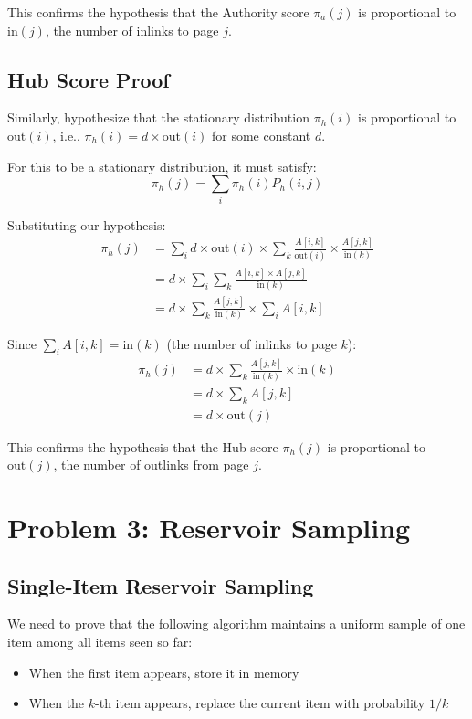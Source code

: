 \documentclass{article}
\begin{document}
This confirms the hypothesis that the Authority score $\pi_a(j)$ is proportional to $\text{in}(j)$, the number of inlinks to page $j$.

\subsection{Hub Score Proof}

Similarly, hypothesize that the stationary distribution $\pi_h(i)$ is proportional to $\text{out}(i)$, i.e., $\pi_h(i) = d \times \text{out}(i)$ for some constant $d$.

For this to be a stationary distribution, it must satisfy:
\begin{equation}
    \pi_h(j) = \sum_i \pi_h(i) P_h(i,j)
\end{equation}

Substituting our hypothesis:
\begin{align}
    \pi_h(j) &= \sum_i d \times \text{out}(i) \times \sum_k \frac{A[i,k]}{\text{out}(i)} \times \frac{A[j,k]}{\text{in}(k)}\\
    &= d \times \sum_i \sum_k \frac{A[i,k] \times A[j,k]}{\text{in}(k)}\\
    &= d \times \sum_k \frac{A[j,k]}{\text{in}(k)} \times \sum_i A[i,k]
\end{align}

Since $\sum_i A[i,k] = \text{in}(k)$ (the number of inlinks to page $k$):
\begin{align}
    \pi_h(j) &= d \times \sum_k \frac{A[j,k]}{\text{in}(k)} \times \text{in}(k)\\
    &= d \times \sum_k A[j,k]\\
    &= d \times \text{out}(j)
\end{align}

This confirms the hypothesis that the Hub score $\pi_h(j)$ is proportional to $\text{out}(j)$, the number of outlinks from page $j$.

\section{Problem 3: Reservoir Sampling}

\subsection{Single-Item Reservoir Sampling}
We need to prove that the following algorithm maintains a uniform sample of one item among all items seen so far:
\begin{itemize}
    \item When the first item appears, store it in memory
    \item When the $k$-th item appears, replace the current item with probability $1/k$
\end{itemize}
\end{document}
